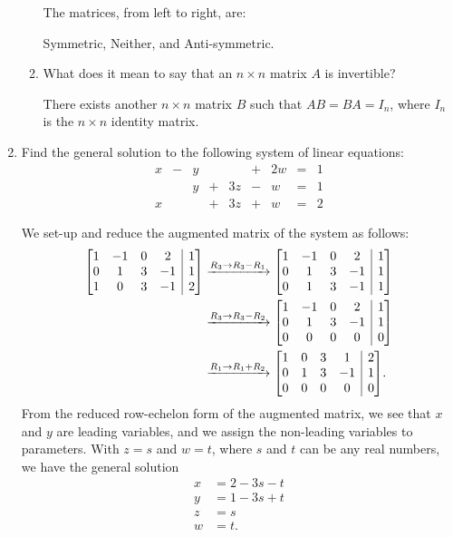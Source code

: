 \documentclass[12pt]{article}
\makeatletter
\newenvironment{amatrix}[1]{%
  \left[\begin{array}{@{}*{#1}{c}|c@{}}
}{%
  \end{array}\right]
}
\newcommand{\points}[1]{\marginpar{\hspace{24pt}[#1]}}
\makeatother
\begin{document}
\begin{enumerate}
\begin{enumerate}
\bigskip

 The matrices, from left to right, are:

Symmetric, Neither, and Anti-symmetric.

\bigskip

\item What does it mean to say that an $n\times n$ matrix $A$ is invertible? \points{2}


\bigskip

 There exists another $n\times n$ matrix $B$ such that $AB=BA=I_n$, where $I_n$ is the $n\times n$ identity matrix.




\end{enumerate}
\newpage

\item Find the general solution to the following system of linear equations: \points{10}
\[
\begin{array}{ccccccccc}
x&-&y& &  &+&2w&=&1\\
 & &y&+&3z&-&w&=&1\\
x&&&+&3z&+ &w &=&2 
\end{array}
\]

\bigskip

 We set-up and reduce the augmented matrix of the system as follows:
\begin{align*}
 \begin{amatrix}{4}
  1&-1&0&2&1\\0&1&3&-1&1\\1&0&3&-1&2
 \end{amatrix}&\xrightarrow[]{R_3\to R_3-R_1}\begin{amatrix}{4}1&-1&0&2&1\\0&1&3&-1&1\\0&1&3&-1&1\end{amatrix}\\
&\xrightarrow[]{R_3\to R_3-R_2}\begin{amatrix}{4}
                             1&-1&0&2&1\\0&1&3&-1&1\\0&0&0&0&0
                            \end{amatrix}\\
&\xrightarrow[]{R_1\to R_1+R_2}\begin{amatrix}{4}
                                 1&0&3&1&2\\0&1&3&-1&1\\0&0&0&0&0
                                \end{amatrix}.
\end{align*}
From the reduced row-echelon form of the augmented matrix, we see that $x$ and $y$ are leading variables, and we assign the non-leading variables to parameters. With $z=s$ and $w=t$, where $s$ and $t$ can be any real numbers, we have the general solution
\begin{align*}
 x& = 2-3s-t\\
 y& = 1-3s+t\\
 z&=s\\
 w&=t.
\end{align*}



\end{enumerate}
\end{document}
